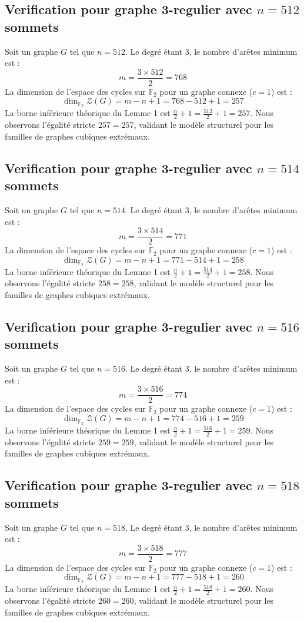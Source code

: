 \documentclass[11pt,a4paper]{article}
\begin{document}
\subsection{Verification pour graphe 3-regulier avec $n=512$ sommets}
Soit un graphe $G$ tel que $n = 512$. Le degré étant 3, le nombre d'arêtes minimum est :
$$ m = \frac{3 \times 512}{2} = 768 $$
La dimension de l'espace des cycles sur $\mathbb{F}_2$ pour un graphe connexe ($c=1$) est :
$$ \dim_{\mathbb{F}_2} \mathcal{Z}(G) = m - n + 1 = 768 - 512 + 1 = 257 $$
La borne inférieure théorique du Lemme 1 est $\frac{n}{2} + 1 = \frac{512}{2} + 1 = 257$.
Nous observons l'égalité stricte $257 = 257$, validant le modèle structurel pour les familles de graphes cubiques extrémaux.

\subsection{Verification pour graphe 3-regulier avec $n=514$ sommets}
Soit un graphe $G$ tel que $n = 514$. Le degré étant 3, le nombre d'arêtes minimum est :
$$ m = \frac{3 \times 514}{2} = 771 $$
La dimension de l'espace des cycles sur $\mathbb{F}_2$ pour un graphe connexe ($c=1$) est :
$$ \dim_{\mathbb{F}_2} \mathcal{Z}(G) = m - n + 1 = 771 - 514 + 1 = 258 $$
La borne inférieure théorique du Lemme 1 est $\frac{n}{2} + 1 = \frac{514}{2} + 1 = 258$.
Nous observons l'égalité stricte $258 = 258$, validant le modèle structurel pour les familles de graphes cubiques extrémaux.

\subsection{Verification pour graphe 3-regulier avec $n=516$ sommets}
Soit un graphe $G$ tel que $n = 516$. Le degré étant 3, le nombre d'arêtes minimum est :
$$ m = \frac{3 \times 516}{2} = 774 $$
La dimension de l'espace des cycles sur $\mathbb{F}_2$ pour un graphe connexe ($c=1$) est :
$$ \dim_{\mathbb{F}_2} \mathcal{Z}(G) = m - n + 1 = 774 - 516 + 1 = 259 $$
La borne inférieure théorique du Lemme 1 est $\frac{n}{2} + 1 = \frac{516}{2} + 1 = 259$.
Nous observons l'égalité stricte $259 = 259$, validant le modèle structurel pour les familles de graphes cubiques extrémaux.

\subsection{Verification pour graphe 3-regulier avec $n=518$ sommets}
Soit un graphe $G$ tel que $n = 518$. Le degré étant 3, le nombre d'arêtes minimum est :
$$ m = \frac{3 \times 518}{2} = 777 $$
La dimension de l'espace des cycles sur $\mathbb{F}_2$ pour un graphe connexe ($c=1$) est :
$$ \dim_{\mathbb{F}_2} \mathcal{Z}(G) = m - n + 1 = 777 - 518 + 1 = 260 $$
La borne inférieure théorique du Lemme 1 est $\frac{n}{2} + 1 = \frac{518}{2} + 1 = 260$.
Nous observons l'égalité stricte $260 = 260$, validant le modèle structurel pour les familles de graphes cubiques extrémaux.
\end{document}
